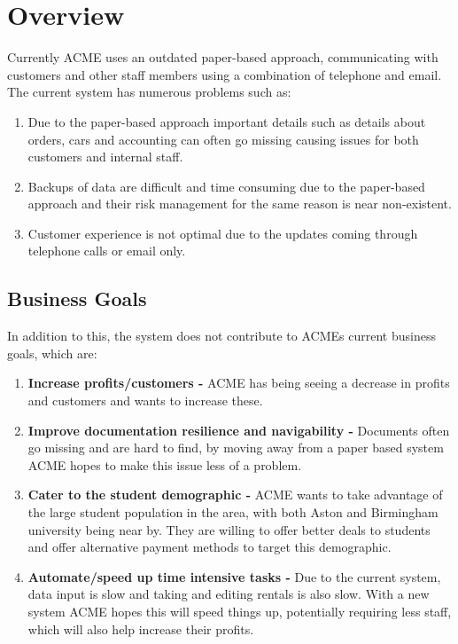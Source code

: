 \section{Overview}

  Currently ACME uses an outdated paper-based approach, communicating with customers and other staff members using a combination of telephone and email.
  The current system has numerous problems such as: 
  \begin{enumerate}
    \item Due to the paper-based approach important details such as details about orders, cars and accounting can often go missing causing issues 
    for both customers and internal staff.
    \item Backups of data are difficult and time consuming due to the paper-based approach and their risk management for the same reason is near non-existent.
    \item Customer experience is not optimal due to the updates coming through telephone calls or email only.
  \end{enumerate}

  \subsection{Business Goals}

  In addition to this, the system does not contribute to ACMEs current business goals, which are:
  \begin{enumerate}
    \item \textbf{Increase profits/customers -} ACME has being seeing a decrease in profits and customers and wants to increase these.
    \item \textbf{Improve documentation resilience and navigability -} Documents often go missing and are hard to find, by moving away from a paper based
    system ACME hopes to make this issue less of a problem.
    \item \textbf{Cater to the student demographic -} ACME wants to take advantage of the large student population in the area, with both Aston and Birmingham
    university being near by. They are willing to offer better deals to students and offer alternative payment methods to target this demographic.
    \item \textbf{Automate/speed up time intensive tasks -} Due to the current system, data input is slow and taking and editing rentals is also slow. With a 
    new system ACME hopes this will speed things up, potentially requiring less staff, which will also help increase their profits.
  \end{enumerate}


